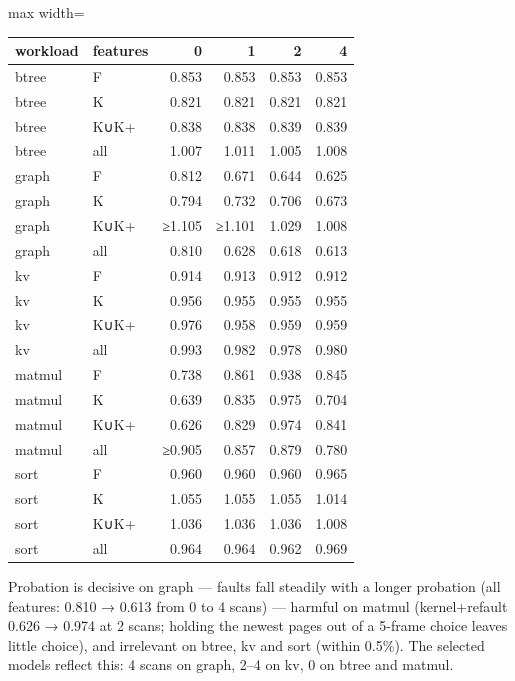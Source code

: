 \documentclass[10pt,a4paper]{article}
\begin{document}
\begin{center}\footnotesize
\begin{adjustbox}{max width=\linewidth}
\begin{tabular}{llrrrr}
\toprule
\textbf{workload} & \textbf{features} & \textbf{0} & \textbf{1} & \textbf{2} & \textbf{4} \\ \midrule
btree & F & 0.853 & 0.853 & 0.853 & 0.853 \\
btree & K & 0.821 & 0.821 & 0.821 & 0.821 \\
btree & K∪K+ & 0.838 & 0.838 & 0.839 & 0.839 \\
btree & all & 1.007 & 1.011 & 1.005 & 1.008 \\
graph & F & 0.812 & 0.671 & 0.644 & 0.625 \\
graph & K & 0.794 & 0.732 & 0.706 & 0.673 \\
graph & K∪K+ & ≥1.105 & ≥1.101 & 1.029 & 1.008 \\
graph & all & 0.810 & 0.628 & 0.618 & 0.613 \\
kv & F & 0.914 & 0.913 & 0.912 & 0.912 \\
kv & K & 0.956 & 0.955 & 0.955 & 0.955 \\
kv & K∪K+ & 0.976 & 0.958 & 0.959 & 0.959 \\
kv & all & 0.993 & 0.982 & 0.978 & 0.980 \\
matmul & F & 0.738 & 0.861 & 0.938 & 0.845 \\
matmul & K & 0.639 & 0.835 & 0.975 & 0.704 \\
matmul & K∪K+ & 0.626 & 0.829 & 0.974 & 0.841 \\
matmul & all & ≥0.905 & 0.857 & 0.879 & 0.780 \\
sort & F & 0.960 & 0.960 & 0.960 & 0.965 \\
sort & K & 1.055 & 1.055 & 1.055 & 1.014 \\
sort & K∪K+ & 1.036 & 1.036 & 1.036 & 1.008 \\
sort & all & 0.964 & 0.964 & 0.962 & 0.969 \\
\bottomrule
\end{tabular}
\end{adjustbox}
\end{center}

Probation is decisive on graph — faults fall steadily with a longer probation (all features: 0.810 → 0.613 from 0 to 4 scans) — harmful on matmul (kernel+refault 0.626 → 0.974 at 2 scans; holding the newest pages out of a 5-frame choice leaves little choice), and irrelevant on btree, kv and sort (within 0.5\%). The selected models reflect this: 4 scans on graph, 2–4 on kv, 0 on btree and matmul.
\end{document}
